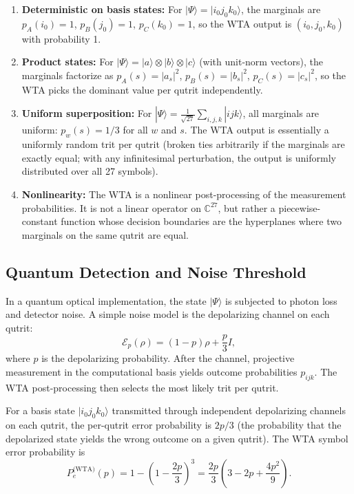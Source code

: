 \documentclass[12pt,a4paper]{article}
\begin{document}
\begin{enumerate}
\item \textbf{Deterministic on basis states:} For
$|\Psi\rangle = |i_0j_0k_0\rangle$, the marginals are
$p_A(i_0)=1$, $p_B(j_0)=1$, $p_C(k_0)=1$, so the WTA
output is $(i_0,j_0,k_0)$ with probability 1.

\item \textbf{Product states:} For
$|\Psi\rangle = |a\rangle \otimes |b\rangle \otimes |c\rangle$ (with
unit-norm vectors), the marginals factorize as $p_A(s) = |a_s|^2$,
$p_B(s) = |b_s|^2$, $p_C(s) = |c_s|^2$, so the WTA picks the dominant
value per qutrit independently.

\item \textbf{Uniform superposition:} For
$|\Psi\rangle = \frac{1}{\sqrt{27}}\sum_{i,j,k} |ijk\rangle$, all
marginals are uniform: $p_w(s) = 1/3$ for all $w$ and $s$. The WTA
output is essentially a uniformly random trit per qutrit (broken ties
arbitrarily if the marginals are exactly equal; with any infinitesimal
perturbation, the output is uniformly distributed over all 27 symbols).

\item \textbf{Nonlinearity:} The WTA is a nonlinear post-processing of
the measurement probabilities. It is not a linear operator on
$\mathbb{C}^{27}$, but rather a piecewise-constant function whose
decision boundaries are the hyperplanes where two marginals on the
same qutrit are equal.
\end{enumerate}

\subsection{Quantum Detection and Noise Threshold}
\label{sec:noise}

In a quantum optical implementation, the state $|\Psi\rangle$ is
subjected to photon loss and detector noise. A simple noise model
is the depolarizing channel on each qutrit:
\[
\mathcal{E}_p(\rho) = (1-p)\rho + \frac{p}{3} I,
\]
where $p$ is the depolarizing probability. After the channel, projective
measurement in the computational basis yields outcome probabilities
$p_{ijk}$. The WTA post-processing then selects the most likely trit
per qutrit.

For a basis state $|i_0j_0k_0\rangle$ transmitted through independent
depolarizing channels on each qutrit, the per-qutrit error probability
is $2p/3$ (the probability that the depolarized state yields the wrong
outcome on a given qutrit). The WTA symbol error probability is
\[
P_e^{\text{(WTA)}}(p) = 1 - \left(1 - \frac{2p}{3}\right)^3
= \frac{2p}{3}\left(3 - 2p + \frac{4p^2}{9}\right).
\]
\end{document}
